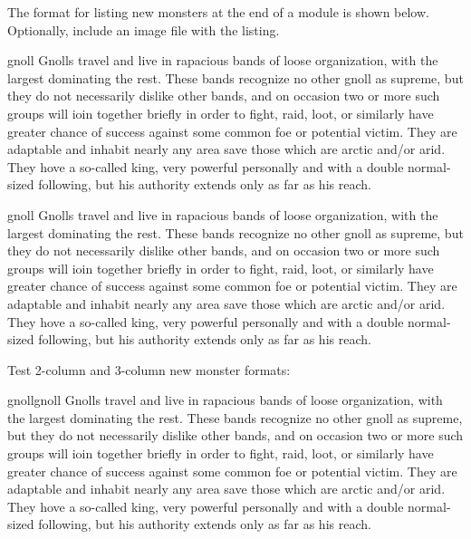\documentclass[a4paper,sansserif,1e]{rpg-module}
\begin{document}
The format for listing new monsters at the end of a module is shown below. Optionally, include an image file with the listing.

\begin{newmonster}{gnoll}
Gnolls travel and live in rapacious bands of loose organization, with the
largest dominating the rest. These bands recognize no other gnoll as
supreme, but they do not necessarily dislike other bands, and on occasion
two or more such groups will ioin together briefly in order to fight, raid,
loot, or similarly have greater chance of success against some common foe
or potential victim. They are adaptable and inhabit nearly any area save
those which are arctic and/or arid. They hove a so-called king, very
powerful personally and with a double normal-sized following, but his
authority extends only as far as his reach.
\end{newmonster}

\begin{newmonster}{gnoll}
Gnolls travel and live in rapacious bands of loose organization, with the
largest dominating the rest. These bands recognize no other gnoll as
supreme, but they do not necessarily dislike other bands, and on occasion
two or more such groups will ioin together briefly in order to fight, raid,
loot, or similarly have greater chance of success against some common foe
or potential victim. They are adaptable and inhabit nearly any area save
those which are arctic and/or arid. They hove a so-called king, very
powerful personally and with a double normal-sized following, but his
authority extends only as far as his reach.
\end{newmonster}

Test 2-column and 3-column new monster formats:

\begin{newmonster2}{gnoll}{gnoll}
Gnolls travel and live in rapacious bands of loose organization, with the
largest dominating the rest. These bands recognize no other gnoll as
supreme, but they do not necessarily dislike other bands, and on occasion
two or more such groups will ioin together briefly in order to fight, raid,
loot, or similarly have greater chance of success against some common foe
or potential victim. They are adaptable and inhabit nearly any area save
those which are arctic and/or arid. They hove a so-called king, very
powerful personally and with a double normal-sized following, but his
authority extends only as far as his reach.
\end{newmonster2}
\end{document}

